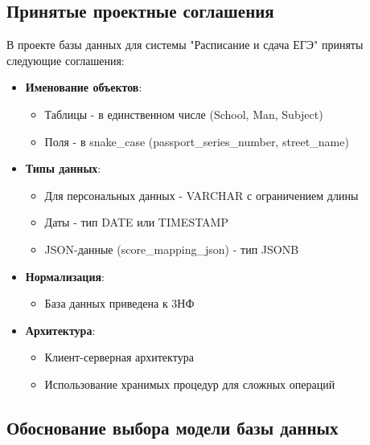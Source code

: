 \documentclass[a4paper]{article}
\begin{document}
\subsection{Принятые проектные соглашения}

В проекте базы данных для системы "Расписание и сдача ЕГЭ" приняты следующие соглашения:

\begin{itemize}
      \item \textbf{Именование объектов}:
            \begin{itemize}
                  \item Таблицы - в единственном числе (School, Man, Subject)
                  \item Поля - в snake\_case (passport\_series\_number, street\_name)
            \end{itemize}

      \item \textbf{Типы данных}:
            \begin{itemize}
                  \item Для персональных данных - VARCHAR с ограничением длины
                  \item Даты - тип DATE или TIMESTAMP
                  \item JSON-данные (score\_mapping\_json) - тип JSONB
            \end{itemize}

      \item \textbf{Нормализация}:
            \begin{itemize}
                  \item База данных приведена к 3НФ
            \end{itemize}

      \item \textbf{Архитектура}:
            \begin{itemize}
                  \item Клиент-серверная архитектура
                  \item Использование хранимых процедур для сложных операций
            \end{itemize}
\end{itemize}

\subsection{Обоснование выбора модели базы данных}
\end{document}
